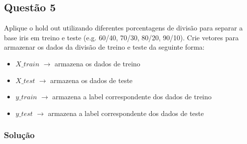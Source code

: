 \documentclass{assignment}
\begin{document}
\subsection*{Questão 5}
Aplique o hold out utilizando diferentes porcentagens de divisão para separar a base iris em
treino e teste (e.g. 60/40, 70/30, 80/20, 90/10). Crie vetores para armazenar os dados da divisão de
treino e teste da seguinte forma:

\begin{itemize}
    \item $X\_train$ $\rightarrow$ armazena os dados de treino
    \item $X\_test$ $\rightarrow$ armazena os dados de teste
    \item $y\_train$ $\rightarrow$ armazena a label correspondente dos dados de treino
    \item $y\_test$ $\rightarrow$ armazena a label correspondente dos dados de teste
\end{itemize}

\subsubsection*{Solução}

\end{document}
